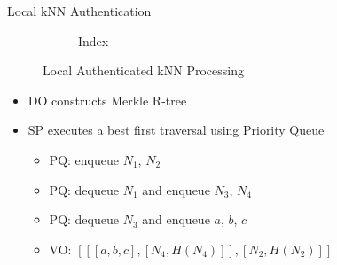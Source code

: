 \documentclass[xcolor={dvipsnames},aspectratio=169,10pt]{beamer}
\begin{document}
\begin{frame}{Local kNN Authentication~\cite{10.1007/s00778-008-0113-2}}
\begin{figure}
\begin{subfigure}[b]{.65\linewidth}
      \caption{Index}
    \end{subfigure}
    \caption{Local Authenticated {kNN} Processing}
  \end{figure}
  \vspace{-2ex}
  \begin{itemize}[<+->]
    \item DO constructs \alert{Merkle R-tree}
    \item SP executes a best first traversal using \alert{Priority Queue}
      \begin{itemize}
        \item PQ: enqueue $N_1$, $N_2$
        \item PQ: dequeue $N_1$ and enqueue $N_3$, $N_4$
        \item PQ: dequeue $N_3$ and enqueue $a$, $b$, $c$
        \item VO: $[[[a, b, c], [N_4, H(N_4)]] ,[N_2, H(N_2)]]$
      \end{itemize}
  \end{itemize}
\end{frame}
\end{document}
